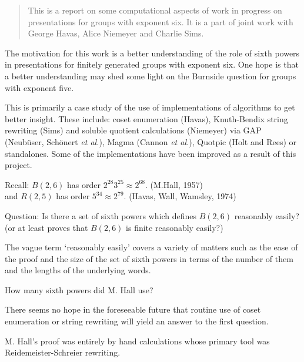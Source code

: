 \documentclass[12pt]{article}
\begin{document}

\author{M.F. Newman}
\date{\today}
\maketitle



\begin{abstract}
This is a report on some computational aspects of work in progress 
on presentations for groups with exponent six. 
It is a part of joint work with George Havas, Alice Niemeyer and Charlie Sims.
\end{abstract}

The motivation for this work is a better understanding of the role 
of sixth powers in
presentations for finitely generated groups with exponent six. 
One hope is that a better understanding may
shed some light on the Burnside question for groups with exponent five.

This is primarily a case study of the use of 
implementations of algorithms to get better insight.
These include: coset enumeration (Havas), Knuth-Bendix string rewriting
(Sims) and soluble quotient calculations (Niemeyer) via
{\sf GAP} (Neub\"user, Sch\"onert {\it et al.}), Magma (Cannon {\it et al.}),
Quotpic (Holt and Rees) or standalones.
Some of the implementations have been improved as a result of this
project.

Recall:  $B(2,6)$ has order $2^{28} 3^{25} \approx 2^{68}$. (M.Hall, 1957)\\
and $R(2,5)$ has order $5^{34} \approx 2^{79}$. (Havas, Wall, Wamsley, 1974)

Question: Is there a set of sixth powers which defines $B(2,6)$
reasonably easily? (or at least proves that $B(2,6)$ is finite 
reasonably easily?)

The vague term `reasonably easily' covers a variety of matters such
as the ease of the proof and the size of the set of sixth powers in
terms of the number of them and the lengths of the underlying words.

How many sixth powers did M. Hall use?

There seems no hope in the foreseeable future that routine use of
coset enumeration or string rewriting will yield an answer to the
first question.

M. Hall's proof was entirely by hand calculations whose primary tool
was Reidemeister-Schreier rewriting.
\end{document}
